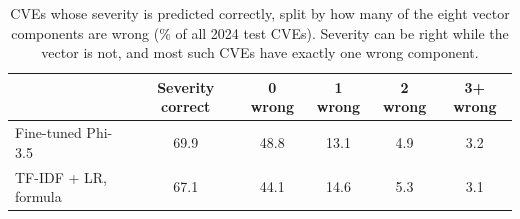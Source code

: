 \begin{table}[t]
\centering
\caption{CVEs whose severity is predicted correctly, split by how many of the eight vector components are wrong (\% of all 2024 test CVEs). Severity can be right while the vector is not, and most such CVEs have exactly one wrong component.}
\label{tab:gap}
\small
\begin{tabular}{lccccc}
\toprule
 & Severity correct & 0 wrong & 1 wrong & 2 wrong & 3+ wrong \\
\midrule
Fine-tuned Phi-3.5 & 69.9 & 48.8 & 13.1 & 4.9 & 3.2 \\
TF-IDF + LR, formula & 67.1 & 44.1 & 14.6 & 5.3 & 3.1 \\
\bottomrule
\end{tabular}
\end{table}

